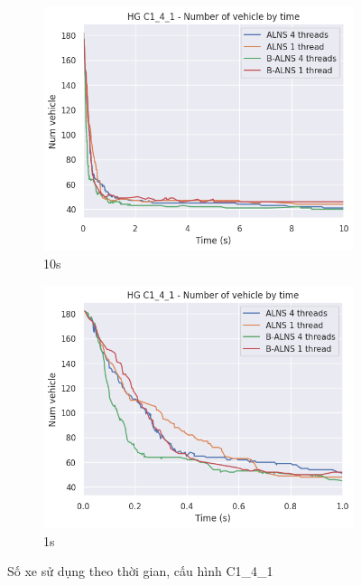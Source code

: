 \begin{figure}[H] %
  \label{fig:perf_ct_c1_4}
  \begin{subfigure}{.5\textwidth}
    \centering
    \includegraphics[width=0.9\linewidth]{figures/nv_time_10s_C1_4_1.png}
    \caption{10s}
    \label{fig:perf_ct_c1_4_10s}
  \end{subfigure}%
  \begin{subfigure}{.5\textwidth}
    \centering
    \includegraphics[width=0.9\linewidth]{figures/nv_time_1s_C1_4_1.png}
    \caption{1s}
    \label{fig:perf_ct_c1_4_1s}
  \end{subfigure}
  \caption{Số xe sử dụng theo thời gian, cấu hình C1\_4\_1}
\end{figure}

